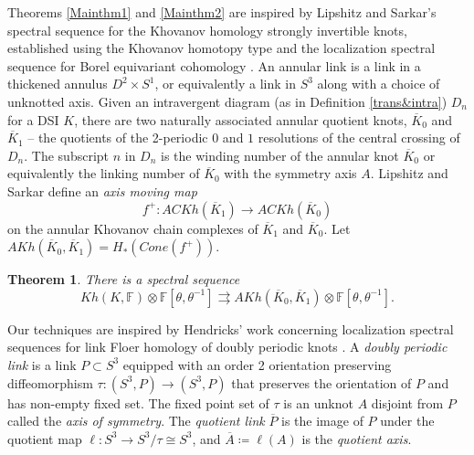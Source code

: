 \documentclass[11pt]{amsart}
\newtheorem{theorem}{Theorem}[section]
\theoremstyle{definition}
\theoremstyle{remark}
\def\F{\mathbb{F}}
\numberwithin{equation}{section}
\begin{document}
Theorems \ref{Mainthm1} and \ref{Mainthm2} are inspired by Lipshitz and Sarkar's spectral sequence for the Khovanov homology strongly invertible knots, established using the Khovanov homotopy type and the localization spectral sequence for Borel equivariant cohomology \cite{KhSI}. An annular link is a link in a thickened annulus $D^2\times S^1$, or equivalently a link in $S^3$ along with a choice of unknotted axis. Given an intravergent diagram (as in Definition \ref{trans&intra}) $D_n$ for a DSI $K$, there are two naturally associated annular quotient knots, $\overline{K}_0$ and $\overline{K}_1$ -- the quotients of the 2-periodic $0$ and $1$ resolutions of the central crossing of $D_n$. The subscript $n$ in $D_n$ is the winding number of the annular knot $\overline{K}_0$ or equivalently the linking number of $\overline{K}_0$ with the symmetry axis $A$. Lipshitz and Sarkar define an \emph{axis moving map} \[f^+\colon ACKh(\overline{K}_1)\to ACKh(\overline{K}_0)\]  on the annular Khovanov chain complexes of $\overline{K}_1$ and $\overline{K}_0$. Let $AKh(\overline{K}_0,\overline{K}_1)=H_*(Cone(f^+)).$ 
\begin{theorem}\cite[~Theorem 1.1]{KhSI}
There is a spectral sequence \[Kh(K, \F)\otimes \F[\theta, \theta^{-1}]\rightrightarrows AKh(\overline{K}_0, \overline{K}_1)\otimes \F[\theta,\theta^{-1}].\]

\end{theorem}
 
Our techniques are inspired by Hendricks' work concerning localization spectral sequences for link Floer homology of doubly periodic knots \cite{HendricksDP}.
A \emph{doubly periodic link} is a link $P\subset S^3$ equipped with an order 2 orientation preserving diffeomorphism $\tau\colon  (S^3,P)\to (S^3,P)$  that preserves the orientation of $P$ and has non-empty fixed set. The fixed point set of $\tau$ is an unknot $A$ disjoint from $P$ called the \emph{axis of symmetry}. The \emph{quotient link} $\overline{P}$ is the image of $P$ under the quotient map $\ell\colon S^3\to S^3/\tau\cong S^3$, and $\overline{A}\coloneq \ell(A)$ is the \emph{quotient axis}.
\end{document}
